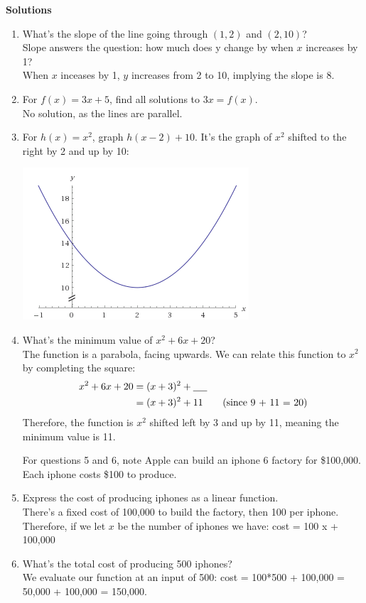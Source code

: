 \documentclass[a4paper, 12pt]{article}
\newcommand{\bt}[1]{\textbf{#1}} %
\newcommand{\eq}[1]{\begin{align*}#1\end{align*}} %
\renewcommand{\eq}[1]{\begin{align*}#1\end{align*}} %
\newcommand{\green}[1]{\textcolor{javagreen}{#1}} %
\begin{document}
\centerline{\bt{Solutions}}
\begin{enumerate}
    \item What's the slope of the line going through $(1, 2)$ and $(2, 10)$?\\
    \green{
    Slope answers the question: how much does y change by when $x$ increases by 1?\\
    When $x$ inceases by 1, $y$ increases from 2 to 10, implying the slope is 8.
    }

    \item For $f(x) = 3x + 5$, find all solutions to $3x = f(x)$. \\
    \green{
    No solution, as the lines are parallel.
    }
    \item For $h(x) = x^2$, graph $h(x-2) + 10$.
    \green{
    It's the graph of $x^2$ shifted to the right by 2 and up by 10:
    }

    \includegraphics{graphs/x2_right_up.png}
    \item What's the minimum value of $x^2 + 6x + 20$? \\
    \green{
    The function is a parabola, facing upwards. We can relate this function to $x^2$ by completing the square:
    \eq{
    x^2 + 6x + 20 & = (x+3)^2 + \text{\underline{\hspace{0.5cm}}} \\
    & = (x+3)^2 + 11 \tag{since 9 + 11 = 20}
    }
    Therefore, the function is $x^2$ shifted left by 3 and up by 11, meaning the minimum value is 11.
    }


   For questions 5 and 6, note Apple can build an iphone 6 factory for \$100,000. Each iphone costs \$100 to produce. 
    \item Express the cost of producing iphones as a linear function. \\
    \green{
    There's a fixed cost of 100,000 to build the factory, then 100 per iphone. Therefore, if we let $x$ be the number of iphones we have: 
    cost = 100 x + 100,000
    }
    \item What's the total cost of producing 500 iphones? \\
    \green{
    We evaluate our function at an input of 500: 
    cost = 100*500 + 100,000 = 50,000 + 100,000 = 150,000.
    }
\end{enumerate}
\end{document}
